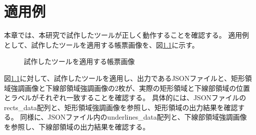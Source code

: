 \chapter{適用例}\label{cha:Indication}
本章では、本研究で試作したツールが正しく動作することを確認する。
適用例として、試作したツールを適用する帳票画像を、図\ref{fig:indication_original}に示す。

\begin{figure}[tp]
    \begin{center}
        \caption{試作したツールを適用する帳票画像}
        \label{fig:indication_original}
    \end{center}
\end{figure}

図\ref{fig:indication_original}に対して、試作したツールを適用し、出力であるJSONファイルと、矩形領域強調画像と下線部領域強調画像の2枚が、実際の矩形領域と下線部領域の位置とラベルがそれぞれ一致することを確認する。
具体的には、JSONファイルのrects\_data配列と、矩形領域強調画像を参照し、矩形領域の出力結果を確認する。
同様に、JSONファイル内のunderlines\_data配列と、下線部領域強調画像を参照し、下線部領域の出力結果を確認する。

